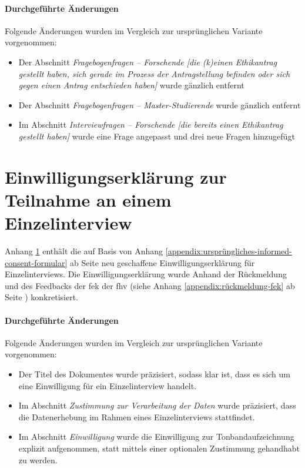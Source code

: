 \documentclass[a4paper,12pt,twoside]{scrreprt}
\begin{document}
\subsubsection*{Durchgeführte Änderungen}
\label{appendix:änderungen-interview-leitfaden}

Folgende Änderungen wurden im Vergleich zur ursprünglichen Variante vorgenommen:
\begin{itemize}
    \item Der Abschnitt \textit{Fragebogenfragen -- Forschende [die (k)einen Ethikantrag gestellt haben, sich gerade im Prozess der Antragstellung befinden oder sich gegen einen Antrag entschieden haben]} wurde gänzlich entfernt
    \item Der Abschnitt \textit{Fragebogenfragen -- Master-Studierende} wurde gänzlich entfernt
    \item Im Abschnitt \textit{Interviewfragen -- Forschende [die bereits einen Ethikantrag gestellt haben]} wurde eine Frage angepasst und drei neue Fragen hinzugefügt
\end{itemize}



\cleardoublepage
\chapter{Einwilligungserklärung zur Teilnahme an einem Einzelinterview}
\label{appendix:informed-consent-einzelinterview}

Anhang \ref{appendix:informed-consent-einzelinterview} enthält die auf Basis von Anhang \ref{appendix:ursprüngliches-informed-consent-formular} ab Seite \pageref{appendix:ursprüngliches-informed-consent-formular} neu geschaffene Einwilligungserklärung für Einzelinterviews. Die Einwilligungserklärung wurde Anhand der Rückmeldung und des Feedbacks der \acl{fek} der \acl{fhv} (siehe Anhang \ref{appendix:rückmeldung-fek} ab Seite \pageref{appendix:rückmeldung-fek}) konkretisiert.

\subsubsection*{Durchgeführte Änderungen}
\label{appendix:änderungen-informed-consent-einzelinterview}

Folgende Änderungen wurden im Vergleich zur ursprünglichen Variante vorgenommen:
\begin{itemize}
    \item Der Titel des Dokumentes wurde präzisiert, sodass klar ist, dass es sich um eine Einwilligung für ein Einzelinterview handelt.
    \item Im Abschnitt \textit{Zustimmung zur Verarbeitung der Daten} wurde präzisiert, dass die Datenerhebung im Rahmen eines Einzelinterviews stattfindet.
    \item Im Abschnitt \textit{Einwilligung} wurde die Einwilligung zur Tonbandaufzeichnung explizit aufgenommen, statt mittels einer optionalen Zustimmung gehandhabt zu werden.
\end{itemize}
\end{document}
